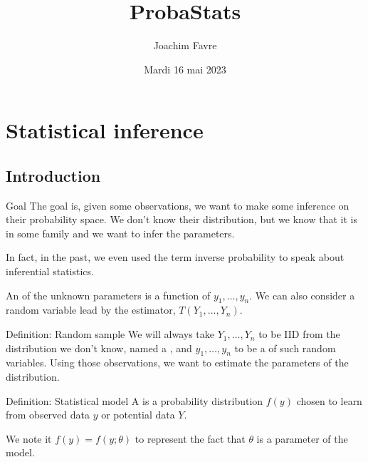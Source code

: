 \documentclass[a4paper]{article}
\title{ProbaStats}
\author{Joachim Favre}
\date{Mardi 16 mai 2023}
\begin{document}
\maketitle


\section{Statistical inference}
\subsection{Introduction}
\begin{parag}{Goal}
    The goal is, given some observations, we want to make some inference on their probability space. We don't know their distribution, but we know that it is in some family and we want to infer the parameters. 

    In fact, in the past, we even used the term inverse probability to speak about inferential statistics.

    An  of the unknown parameters is a function of $y_1, \ldots, y_n$. We can also consider a random variable lead by the estimator, $T\left(Y_1, \ldots, Y_n\right)$.
\end{parag}

\begin{parag}{Definition: Random sample}
    We will always take $Y_1, \ldots, Y_n$ to be IID from the distribution we don't know, named a , and $y_1, \ldots, y_n$ to be a  of such random variables. Using those observations, we want to estimate the parameters of the distribution. 
\end{parag}

\begin{parag}{Definition: Statistical model}
    A  is a probability distribution $f\left(y\right)$ chosen to learn from observed data $y$ or potential data $Y$.

    We note it $f\left(y\right) = f\left(y; \theta\right)$ to represent the fact that $\theta$ is a parameter of the model.
\end{parag}
\end{document}
